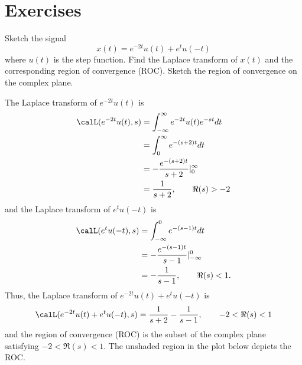 \section*{Exercises}

\begin{excersizelist}

\item Sketch the signal
\[
x(t) = e^{-2t} u(t) + e^{t} u(-t)
\]
where $u(t)$ is the step function.  Find the Laplace transform of $x(t)$ and the corresponding region of convergence (ROC).  Sketch the region of convergence on the complex plane.
\begin{solution}
\begin{center}
\end{center}

The Laplace transform of $e^{-2t}u(t)$ is
\begin{align*}
\calL(e^{-2t}u(t), s) &= \int_{-\infty}^{\infty} e^{-2t}u(t) e^{-st} dt \\
&= \int_{0}^{\infty} e^{-(s+2)t} dt \\
&= -\frac{e^{-(s+2)t}}{s+2} \vert_{0}^\infty \\
&= \frac{1}{s+2}, \qquad \Re(s) > -2
\end{align*}
and the Laplace transform of $e^{t}u(-t)$ is
\begin{align*}
\calL(e^{t}u(-t), s) &= \int_{-\infty}^{0} e^{-(s-1)t} dt \\
&= -\frac{e^{-(s-1)t}}{s-1} \vert_{-\infty}^0 \\
&= -\frac{1}{s-1}, \qquad \Re(s) < 1.
\end{align*}
Thus, the Laplace transform of $e^{-2t} u(t) + e^{t} u(-t)$ is
\[
\calL(e^{-2t} u(t) + e^{t} u(-t), s) = \frac{1}{s+2} - \frac{1}{s-1}, \qquad -2 < \Re(s) < 1
\]
and the region of convergence (ROC) is the subset of the complex plane satisfying $-2 < \Re(s) < 1$.  The unshaded region in the plot below depicts the ROC.


\end{solution}
\end{excersizelist}
